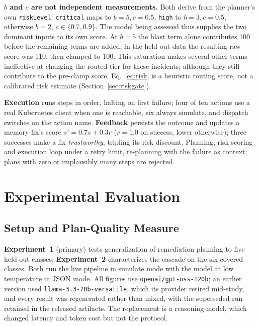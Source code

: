 \documentclass[conference]{IEEEtran}
\begin{document}
\textbf{$b$ and $c$ are not independent measurements.} Both derive from
the planner's own \texttt{riskLevel}: \texttt{critical} maps to
$b{=}5, c{=}0.5$, \texttt{high} to $b{=}3, c{=}0.5$, otherwise $b{=}2$,
$c\in\{0.7,0.9\}$. The model being assessed thus supplies the two
dominant inputs to its own score. At $b{=}5$ the blast term alone
contributes 100 before the remaining terms are added; in the held-out
data the resulting raw score was 110, then clamped to 100. This
saturation makes several other terms ineffective at changing the routed
tier for these incidents, although they still contribute to the
pre-clamp score. Eq.~\eqref{eq:risk} is a heuristic routing score, not a
calibrated risk estimate (Section~\ref{sec:riskgate}).

\textbf{Execution} runs steps in order, halting on first failure; four of
ten actions use a real Kubernetes client when one is reachable, six
always simulate, and dispatch switches on the action name.
\textbf{Feedback} persists the outcome and updates a memory fix's score
$s'=0.7s+0.3r$ ($r{=}1.0$ on success, lower otherwise); three successes
make a fix \emph{trustworthy}, tripling
its risk discount. Planning, risk scoring and execution loop under a
retry limit, re-planning with the failure as context; plans with zero or
implausibly many steps are rejected.

\section{Experimental Evaluation}

\subsection{Setup and Plan-Quality Measure}
\textbf{Experiment~1} (primary) tests generalization of remediation
planning to five held-out classes; \textbf{Experiment~2} characterizes
the cascade on the six covered classes. Both run the live pipeline in
simulate mode with the model at low temperature in JSON mode. All
figures use \texttt{openai/gpt-oss-120b}; an earlier version used
\texttt{llama-3.3-70b-versatile}, which its provider retired mid-study,
and every result was regenerated rather than mixed, with the superseded
run retained in the released artifacts. The replacement is a reasoning
model, which changed latency and token cost but not the protocol.
\end{document}
